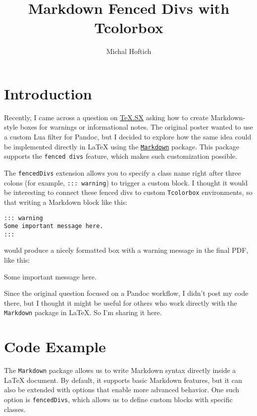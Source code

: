 \documentclass[]{article}
\title{Markdown Fenced Divs with Tcolorbox}
\author{Michal Hoftich}
\begin{document}
\maketitle

\section{Introduction}

Recently, I came across a question on \href{https://tex.stackexchange.com/q/752194/2891}{TeX.SX} asking how to create Markdown-style boxes for warnings or informational notes.  
The original poster wanted to use a custom Lua filter for Pandoc, but I decided to explore how the same idea could be implemented directly in \LaTeX{} using the \href{https://ctan.org/pkg/markdown?lang=en}{\texttt{Markdown}} package. This package supports the \texttt{fenced divs} feature, which makes such customization possible.  

The \texttt{fencedDivs} extension allows you to specify a class name right after three colons (for example, \texttt{::: warning}) to trigger a custom block.  
I thought it would be interesting to connect these fenced divs to custom \texttt{Tcolorbox} environments, so that writing a Markdown block like this:

\begin{verbatim}
::: warning
Some important message here.
:::
\end{verbatim}

would produce a nicely formatted box with a warning message in the final PDF, like this:

\begin{warning}
Some important message here.
\end{warning}

Since the original question focused on a Pandoc workflow, I didn’t post my code there, but I thought it might be useful for others who work directly with the \texttt{Markdown} package in \LaTeX{}. So I’m sharing it here.

\section{Code Example}

The \texttt{Markdown} package allows us to write Markdown syntax directly inside a \LaTeX{} document.  
By default, it supports basic Markdown features, but it can also be extended with options that enable more advanced behavior. One such option is \texttt{fencedDivs}, which allows us to define custom blocks with specific classes.
\end{document}
